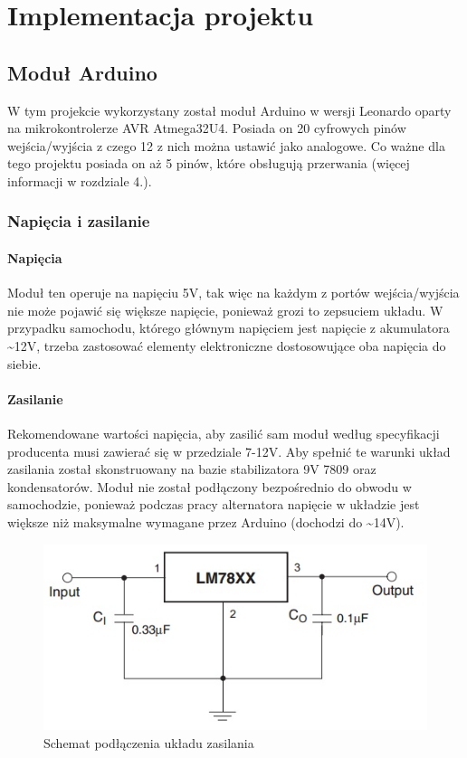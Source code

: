 \chapter{Implementacja projektu}
\section{Moduł Arduino}
W tym projekcie wykorzystany został moduł Arduino w wersji Leonardo oparty na mikrokontrolerze AVR Atmega32U4. Posiada on 20 cyfrowych pinów wejścia/wyjścia z czego 12 z nich można ustawić jako analogowe. Co ważne dla tego projektu posiada on aż 5 pinów, które obsługują przerwania (więcej informacji w rozdziale 4.).
\subsection{Napięcia i zasilanie}
\subsubsection{Napięcia}
Moduł ten operuje na napięciu 5V, tak więc na każdym z portów wejścia/wyjścia nie może pojawić się większe napięcie, ponieważ grozi to zepsuciem układu. W przypadku samochodu, którego głównym napięciem jest napięcie z akumulatora \textasciitilde12V, trzeba zastosować elementy elektroniczne dostosowujące oba napięcia do siebie.
\subsubsection{Zasilanie}
Rekomendowane wartości napięcia, aby zasilić sam moduł według specyfikacji producenta musi zawierać się w przedziale 7-12V. Aby spełnić te warunki układ zasilania został skonstruowany na bazie stabilizatora 9V 7809 oraz kondensatorów. Moduł nie został podłączony bezpośrednio do obwodu w samochodzie, ponieważ podczas pracy alternatora napięcie w układzie jest większe niż maksymalne wymagane przez Arduino (dochodzi do \textasciitilde14V).

\begin{figure}[ht]
\centering
\includegraphics[width=0.7\linewidth]{Rysunki/78xx.jpg}
\caption{Schemat podłączenia układu zasilania \cite{LM78XX}}
\label{fig:LM78XX}
\end{figure}

